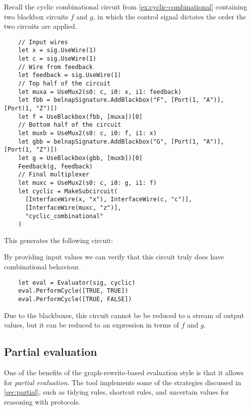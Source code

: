 \begin{example}
  Recall the cyclic combinational circuit from \cref{ex:cyclic-combinational}
  containing two blackbox circuits \(f\) and \(g\), in which the control signal
  dictates the order the two circuits are applied.
  \begin{lstlisting}
    // Input wires
    let x = sig.UseWire(1)
    let c = sig.UseWire(1)
    // Wire from feedback
    let feedback = sig.UseWire(1)
    // Top half of the circuit
    let muxa = UseMux2(s0: c, i0: x, i1: feedback)
    let fbb = belnapSignature.AddBlackbox("F", [Port(1, "A")], [Port(1, "Z")])
    let f = UseBlackbox(fbb, [muxa])[0]
    // Bottom half of the circuit
    let muxb = UseMux2(s0: c, i0: f, i1: x)
    let gbb = belnapSignature.AddBlackbox("G", [Port(1, "A")], [Port(1, "Z")])
    let g = UseBlackbox(gbb, [muxb])[0]
    Feedback(g, feedback)
    // Final multiplexer
    let muxc = UseMux2(s0: c, i0: g, i1: f)
    let cyclic = MakeSubcircuit(
      [InterfaceWire(x, "x"), InterfaceWire(c, "c")],
      [InterfaceWire(muxc, "z")],
      "cyclic_combinational"
    )
  \end{lstlisting}
  This generates the following circuit:
  \begin{center}
    
  \end{center}
  By providing input values we can verify that this circuit truly does have
  combinational behaviour.
  \begin{lstlisting}
    let eval = Evaluator(sig, cyclic)
    eval.PerformCycle([TRUE, TRUE])
    eval.PerformCycle([TRUE, FALSE])
  \end{lstlisting}
  Due to the blackboxes, this circuit cannot be be reduced to a stream of output
  values, but it can be reduced to an expression in terms of \(f\) and \(g\).
  \begin{center}
    
  \end{center}
\end{example}

\subsection{Partial evaluation}

One of the benefits of the graph-rewrite-based evaluation style is that it
allows for \emph{partial evaluation}.
The tool implements some of the strategies discussed in \cref{sec:partial}, such
as tidying rules, shortcut rules, and uncertain values for reasoning with
protocols.


